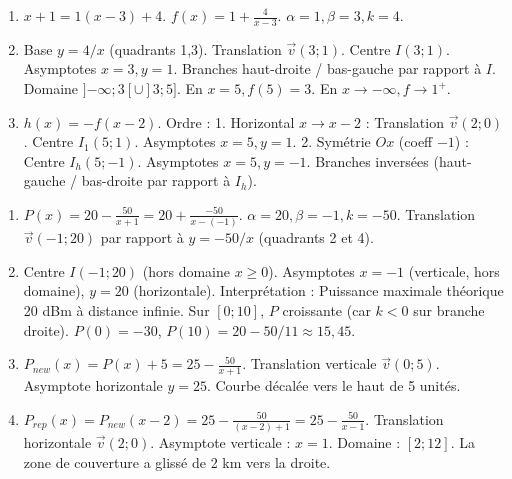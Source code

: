 \documentclass[11pt]{article}
\begin{document}
\begin{corrige}[Exercice 2]
\begin{enumerate}
    \item $x+1 = 1(x-3) + 4$. $f(x) = 1 + \frac{4}{x-3}$. $\alpha=1, \beta=3, k=4$.
    \item Base $y=4/x$ (quadrants 1,3). Translation $\vec{v}(3;1)$. Centre $I(3;1)$. Asymptotes $x=3, y=1$. Branches haut-droite / bas-gauche par rapport à $I$. Domaine $]{- \infty};3[ \cup ]3;5]$. En $x=5, f(5)=3$. En $x \to {- \infty}, f \to 1^+$.
    \item $h(x) = -f(x-2)$.
        Ordre : 1. Horizontal $x \to x-2$ : Translation $\vec{v}(2;0)$. Centre $I_1(5;1)$. Asymptotes $x=5, y=1$.
        2. Symétrie $Ox$ (coeff $-1$) : Centre $I_h(5;-1)$. Asymptotes $x=5, y=-1$. Branches inversées (haut-gauche / bas-droite par rapport à $I_h$).
\end{enumerate}
\end{corrige}

\begin{corrige}[Exercice 3]
\begin{enumerate}
    \item $P(x) = 20 - \frac{50}{x+1} = 20 + \frac{-50}{x-(-1)}$. $\alpha=20, \beta=-1, k=-50$. Translation $\vec{v}(-1;20)$ par rapport à $y=-50/x$ (quadrants 2 et 4).
    \item Centre $I(-1;20)$ (hors domaine $x\ge 0$). Asymptotes $x=-1$ (verticale, hors domaine), $y=20$ (horizontale). Interprétation : Puissance maximale théorique 20 dBm à distance infinie. Sur $[0;10]$, $P$ croissante (car $k<0$ sur branche droite). $P(0)=-30$, $P(10)=20-50/11 \approx 15,45$.
    \item $P_{new}(x) = P(x) + 5 = 25 - \frac{50}{x+1}$. Translation verticale $\vec{v}(0;5)$. Asymptote horizontale $y=25$. Courbe décalée vers le haut de 5 unités.
    \item $P_{rep}(x) = P_{new}(x-2) = 25 - \frac{50}{(x-2)+1} = 25 - \frac{50}{x-1}$. Translation horizontale $\vec{v}(2;0)$. Asymptote verticale : $x=1$. Domaine : $[2;12]$. La zone de couverture a glissé de 2 km vers la droite.
\end{enumerate}
\end{corrige}
\end{document}
